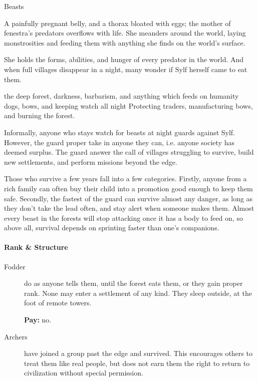 \begin{multicols}{2}
  {Beasts}%
  {%
    A painfully pregnant belly, and a thorax bloated with eggs; the mother of \gls{fenestra}'s predators overflows with life.
    She meanders around the world, laying monstrosities and feeding them with anything she finds on the world's surface.

    She holds the forms, abilities, and hunger of every predator in the world.
    And when full villages disappear in a night, many wonder if Sylf herself came to eat them.
  }%
  {the deep forest, darkness, barbarism, and anything which feeds on humanity}%
  {dogs, bows, and keeping watch all night}%
  {}%
  {
    Protecting traders, manufacturing bows, and burning the forest.
  }%

Informally, anyone who stays watch for beasts at night guards against Sylf.
However, the \gls{guard} proper take in anyone they can, i.e. anyone society has deemed surplus.
The \gls{guard} answer the call of villages struggling to survive, build new settlements, and perform missions beyond the \gls{edge}.

Those who survive a few years fall into a few categories.
Firstly, anyone from a rich family can often buy their child into a promotion good enough to keep them safe.
Secondly, the fastest of the \gls{guard} can survive almost any danger, as long as they don't take the lead often, and stay alert when someone makes them.
Almost every beast in the forests will stop attacking once it has a body to feed on, so above all, survival depends on sprinting faster than one's companions.

\paragraph{Rank \& Structure}

\begin{description}
  \item[Fodder]
  \label{fodder}%
  do as anyone tells them, until the forest eats them, or they gain proper rank.
  None may enter a settlement of any kind.
  They sleep outside, at the foot of remote towers.

  \textbf{Pay:} no.

  \item[Archers]
  have joined a group past the \gls{edge} and survived.
  This encourages others to treat them like real people, but does not earn them the right to return to civilization without special permission.


\end{description}
\end{multicols}
